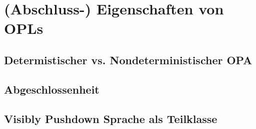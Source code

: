 \section{(Abschluss-) Eigenschaften von OPLs}

\subsection{Determistischer vs. Nondeterministischer OPA}

\subsection{Abgeschlossenheit}

\subsection{Visibly Pushdown Sprache als Teilklasse}